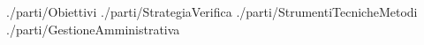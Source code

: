 \documentclass[a4paper,12pt]{article}
\title{\titoloDoc}
\newcommand{\parti}{./parti/}
\newcommand{\temp}{../Template/}
\begin{document}
	\newpage
	\newpage
	\tableofcontents %
	\newpage
	\newpage
	
	\newpage
	 {\parti Obiettivi}
	\newpage
	 {\parti StrategiaVerifica}
	\newpage
	 {\parti StrumentiTecnicheMetodi}
	\newpage
	 {\parti GestioneAmministrativa}
\end{document}
